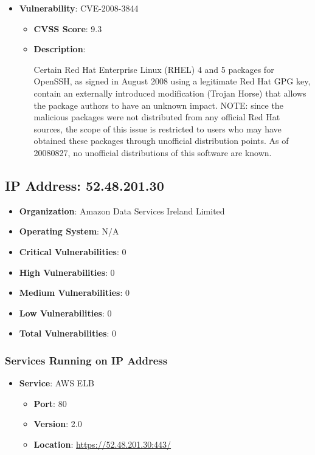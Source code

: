 \documentclass{article}
\begin{document}
\begin{itemize}
        \item \textbf{Vulnerability}: CVE-2008-3844
        \begin{itemize}
            \item \textbf{CVSS Score}:  9.3 
            \item \textbf{Description}:
            \parbox[t]{0.9\linewidth}{
                \ttfamily Certain Red Hat Enterprise Linux (RHEL) 4 and 5 packages for OpenSSH, as signed in August 2008 using a legitimate Red Hat GPG key, contain an externally introduced modification (Trojan Horse) that allows the package authors to have an unknown impact.  NOTE: since the malicious packages were not distributed from any official Red Hat sources, the scope of this issue is restricted to users who may have obtained these packages through unofficial distribution points.  As of 20080827, no unofficial distributions of this software are known.
            }
        \end{itemize}
    
\end{itemize}




\clearpage



\subsection*{IP Address: 52.48.201.30}

\begin{itemize}
    \item \textbf{Organization}: Amazon Data Services Ireland Limited
    \item \textbf{Operating System}:  N/A 
    \item \textbf{Critical Vulnerabilities}: 0
    \item \textbf{High Vulnerabilities}: 0
    \item \textbf{Medium Vulnerabilities}: 0
    \item \textbf{Low Vulnerabilities}: 0
    \item \textbf{Total Vulnerabilities}: 0
\end{itemize}

\subsubsection*{Services Running on IP Address}

\begin{itemize}
    
        \item \textbf{Service}: AWS ELB
        \begin{itemize}
            \item \textbf{Port}: 80
            \item \textbf{Version}:  2.0 
            \item \textbf{Location}: \href{ https://52.48.201.30:443/ }{ https://52.48.201.30:443/ }
        \end{itemize}
    
\end{itemize}
\end{document}
